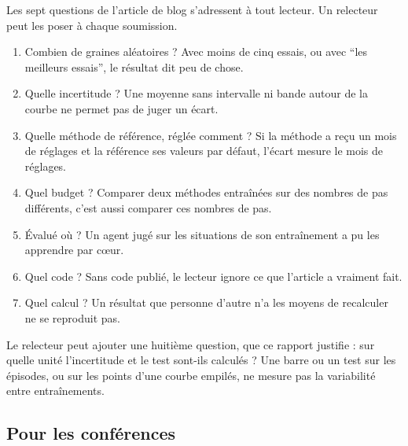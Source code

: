 Les sept questions de l'article de blog s'adressent à tout lecteur. Un relecteur peut les poser à
chaque soumission.
\begin{enumerate}
  \item Combien de graines aléatoires ? Avec moins de cinq essais, ou avec \enquote{les meilleurs
        essais}, le résultat dit peu de chose.
  \item Quelle incertitude ? Une moyenne sans intervalle ni bande autour de la courbe ne permet pas
        de juger un écart.
  \item Quelle méthode de référence, réglée comment ? Si la méthode a reçu un mois de réglages et la
        référence ses valeurs par défaut, l'écart mesure le mois de réglages.
  \item Quel budget ? Comparer deux méthodes entraînées sur des nombres de pas différents, c'est
        aussi comparer ces nombres de pas.
  \item Évalué où ? Un agent jugé sur les situations de son entraînement a pu les apprendre par cœur.
  \item Quel code ? Sans code publié, le lecteur ignore ce que l'article a vraiment fait.
  \item Quel calcul ? Un résultat que personne d'autre n'a les moyens de recalculer ne se reproduit
        pas.
\end{enumerate}
Le relecteur peut ajouter une huitième question, que ce rapport justifie : sur quelle unité
l'incertitude et le test sont-ils calculés ? Une barre ou un test sur les épisodes, ou sur les points
d'une courbe empilés, ne mesure pas la variabilité entre entraînements.

\subsection{Pour les conférences}

